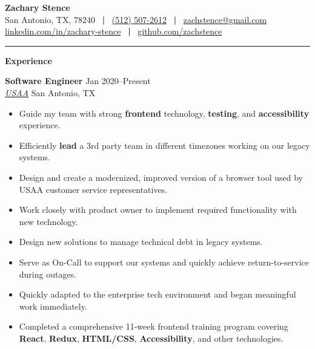 \documentclass[10pt]{article}
\newlength{\headingborderwidth}
\newcommand{\sep}{\ \textbf{|} \ }
\newcommand{\resheading}[1]{
    \begin{mdframed}[
        backgroundcolor=black!15,
        linewidth=\headingborderwidth,
        innertopmargin=4pt,
        innerbottommargin=4pt,
        skipabove=6pt,
        skipbelow=2pt]
        \textbf{\large #1}
    \end{mdframed}
}
\newcommand{\ressubheading}[4]{
    \textbf{#1} \hfill #2 \\[0pt]
    \textit{#3} \hfill #4 \\[0pt]
}
\newenvironment{resitemize}{
    \vspace{-6pt}
    \begin{itemize}
    \setlength\itemsep{-2pt}
}{
    \end{itemize}
}
\begin{document}
\begin{NoHyper}

%
%

\textbf{\huge Zachary Stence} \\[2pt]
San Antonio, TX, 78240 \sep    \href{tel:15125072612}{(512) 507-2612} \sep \href{mailto:zachstence@gmail.com}{zachstence@gmail.com} \\
\href{https://www.linkedin.com/in/zachary-stence}{linkedin.com/in/zachary-stence} \sep  \href{https://www.github.com/zachstence}{github.com/zachstence} \\[6pt]

\hrule
\vspace{2pt}



%
%

\resheading{Experience}

\ressubheading
	{Software Engineer}
	{Jan 2020--Present}
	{\href{https://www.usaa.com}{USAA}}
	{San Antonio, TX}
	\begin{resitemize}
        \item Guide my team with strong \textbf{frontend} technology, \textbf{testing}, and \textbf{accessibility} experience.
        \item Efficiently \textbf{lead} a 3rd party team in different timezones working on our legacy systems.
        \item Design and create a modernized, improved version of a browser tool used by USAA customer service representatives.
        \item Work closely with product owner to implement required functionality with new technology.
        \item Design new solutions to manage technical debt in legacy systems.
        \item Serve as On-Call to support our systems and quickly achieve return-to-service during outages.
        \item Quickly adapted to the enterprise tech environment and began meaningful work immediately.
        \item Completed a comprehensive 11-week frontend training program covering \textbf{React}, \textbf{Redux}, \textbf{HTML/CSS}, \textbf{Accessibility}, and other technologies.
	\end{resitemize}
	

\end{NoHyper}
\end{document}
